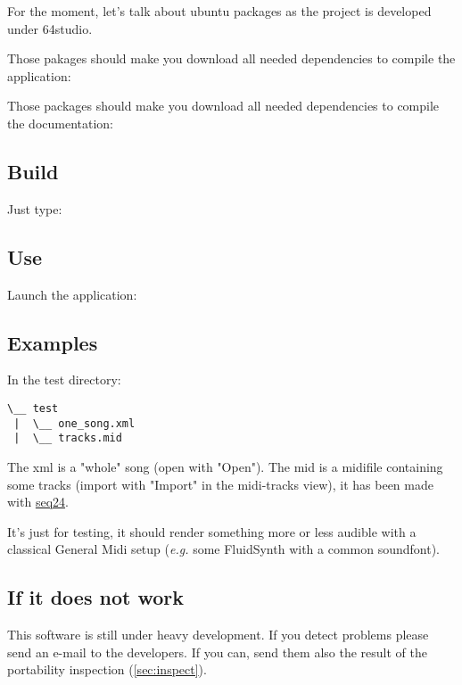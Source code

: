 For the moment, let's talk about ubuntu packages as the project is developed
under 64studio. 

Those pakages should make you download all needed dependencies to compile the
application:


Those packages should make you download all needed dependencies to compile the
documentation:


\subsection{Build}

Just type:


\subsection{Use}

Launch the application:


\subsection{Examples}
In the test directory:

\begin{verbatim}
\__ test
 |  \__ one_song.xml
 |  \__ tracks.mid
\end{verbatim}

The xml is a "whole" song (open with "Open").  The mid is a midifile containing
some tracks (import with "Import" in the midi-tracks view), it has been made
with \href{http://www.filter24.org/seq24/}{seq24}.

It's just for testing, it should render something more or less audible with a
classical General Midi setup (\textit{e.g.} some FluidSynth with a common
soundfont).

\subsection{If it does not work}

This software is still under heavy development. If you detect problems please
send an e-mail to the developers. If you can, send them also the result of the
portability inspection (\ref{sec:inspect}).


